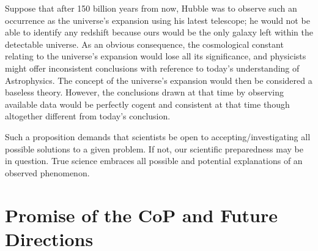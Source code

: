 \documentclass[twoside, 13pt]{article}
\begin{document}
{{{Suppose that after 150 billion years from now, Hubble was to observe such an occurrence as the universe's expansion using his latest telescope; he would not be able to identify any redshift because ours would be the only galaxy left within the detectable universe. As an obvious consequence, the cosmological constant relating to the universe’s expansion would lose all its significance, and physicists might offer inconsistent conclusions with reference to today’s understanding of Astrophysics. The concept of the universe's expansion would then be considered a baseless theory. However, the conclusions drawn at that time by observing available data would be perfectly cogent and consistent at that time though altogether different from today’s conclusion. 

Such a proposition demands that scientists be open to accepting/investigating all possible solutions to a given problem. If not, our scientific preparedness may be in question. True science embraces all possible and potential explanations of an observed phenomenon.}


\newpage

{\fontsize{18}{20}\selectfont\section{Promise of the CoP and Future Directions}}\label{sec-5}

\vspace{-.3cm}

}}
\end{document}

